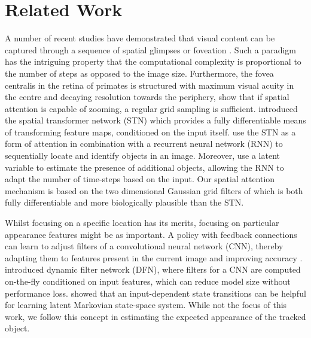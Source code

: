 \section{Related Work}
\label{sec:background}

A number of recent studies have demonstrated that visual content can be captured through a sequence of spatial glimpses or foveation \cite{Graves2014recurrent, Gregor2016towards}. Such a paradigm has the intriguing property that the computational complexity is proportional to the number of steps as opposed to the image size.
Furthermore, the fovea centralis in the retina of primates is structured with maximum visual acuity in the centre and decaying resolution towards the periphery, \citet{Olshausen2016foveal} show that if spatial attention is capable of zooming, a regular grid sampling is sufficient. 
\citet{Jaderberg2015} introduced the spatial transformer network (STN) which provides a fully differentiable means of transforming feature maps, conditioned on the input itself. \citet{Eslami2016air} use the STN as a form of attention in combination with a recurrent neural network (RNN) to sequentially locate and identify objects in an image. Moreover, \citet{Eslami2016air} use a latent variable to estimate the presence of additional objects, allowing the RNN to adapt the number of time-steps based on the input. 
Our spatial attention mechanism is based on the two dimensional Gaussian grid filters of  \cite{Kahou2015ratm} which is both fully differentiable and more biologically plausible than the STN.  


    
Whilst focusing on a specific location has its merits, focusing on particular appearance features might be as important. A policy with feedback connections can learn to adjust filters of a convolutional neural network (CNN), thereby adapting them to features present in the current image and improving accuracy \cite{Stollenga2014}. \citet{Brabandere2016dfn} introduced dynamic filter network (DFN), where filters for a CNN are computed on-the-fly conditioned on input features, which can reduce model size without performance loss. \citet{Karl2017dvbf} showed that an input-dependent state transitions can be helpful for learning latent Markovian state-space system. While not the focus of this work, we follow this concept in estimating the expected appearance of the tracked object.
    
